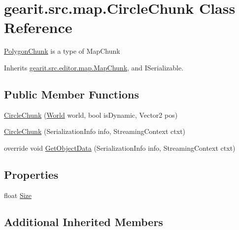 \hypertarget{classgearit_1_1src_1_1map_1_1_circle_chunk}{\section{gearit.\+src.\+map.\+Circle\+Chunk Class Reference}
\label{classgearit_1_1src_1_1map_1_1_circle_chunk}
}


\hyperlink{classgearit_1_1src_1_1map_1_1_polygon_chunk}{Polygon\+Chunk} is a type of Map\+Chunk  




Inherits \hyperlink{classgearit_1_1src_1_1editor_1_1map_1_1_map_chunk}{gearit.\+src.\+editor.\+map.\+Map\+Chunk}, and I\+Serializable.

\subsection*{Public Member Functions}
\begin{DoxyCompactItemize}
\item 
\hyperlink{classgearit_1_1src_1_1map_1_1_circle_chunk_a1c5014d0b7827443bed70324356ae77d}{Circle\+Chunk} (\hyperlink{class_farseer_physics_1_1_dynamics_1_1_world}{World} world, bool is\+Dynamic, Vector2 pos)
\item 
\hyperlink{classgearit_1_1src_1_1map_1_1_circle_chunk_a051d4270e58e19bb67a3f1f1ae352b72}{Circle\+Chunk} (Serialization\+Info info, Streaming\+Context ctxt)
\item 
override void \hyperlink{classgearit_1_1src_1_1map_1_1_circle_chunk_ae7728381e71bffb1bd2c42f8f08325bd}{Get\+Object\+Data} (Serialization\+Info info, Streaming\+Context ctxt)
\end{DoxyCompactItemize}
\subsection*{Properties}
\begin{DoxyCompactItemize}
\item 
float \hyperlink{classgearit_1_1src_1_1map_1_1_circle_chunk_af2003c144d2c3e2d94650c696d392ac3}{Size}
\end{DoxyCompactItemize}
\subsection*{Additional Inherited Members}


